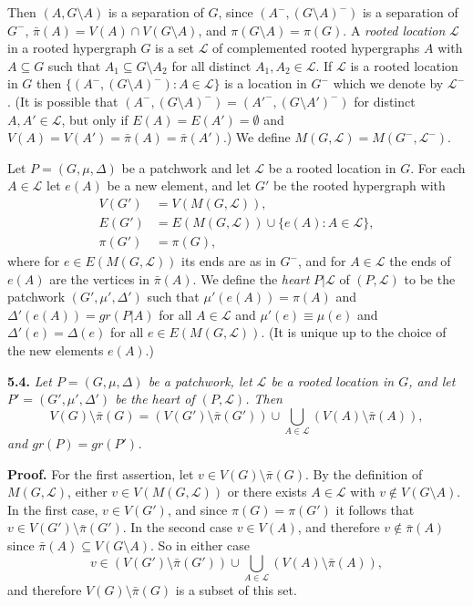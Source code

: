 Then $(A, G \setminus A)$ is a separation of $G$, since $(A^-, (G \setminus A)^-)$ is a separation of $G^-$, $\bar{\pi}(A) = V(A) \cap V(G \setminus A)$, and $\pi(G \setminus A) = \pi(G)$. A \textit{rooted location} $\mathscr{L}$ in a rooted hypergraph $G$ is a set $\mathscr{L}$ of complemented rooted hypergraphs $A$ with $A \subseteq G$ such that $A_1 \subseteq G \setminus A_2$ for all distinct $A_1, A_2 \in \mathscr{L}$. If $\mathscr{L}$ is a rooted location in $G$ then $\{(A^-, (G \setminus A)^-) \colon A \in \mathscr{L}\}$ is a location in $G^-$ which we denote by $\mathscr{L}^-$. (It is possible that $(A^-, (G \setminus A)^-) = (A'^-, (G \setminus A')^-)$ for distinct $A, A' \in \mathscr{L}$, but only if $E(A) = E(A') = \emptyset$ and $V(A) = V(A') = \bar{\pi}(A) = \bar{\pi}(A')$.) We define $M(G, \mathscr{L}) = M(G^-, \mathscr{L}^-)$.

Let $P = (G, \mu, \Delta)$ be a patchwork and let $\mathscr{L}$ be a rooted location in $G$. For each $A \in \mathscr{L}$ let $e(A)$ be a new element, and let $G'$ be the rooted hypergraph with
\begin{align*}
V(G') &= V(M(G, \mathscr{L})), \\
E(G') &= E(M(G, \mathscr{L})) \cup \{e(A) \colon A \in \mathscr{L}\}, \\
\pi(G') &= \pi(G),
\end{align*}
where for $e \in E(M(G, \mathscr{L}))$ its ends are as in $G^-$, and for $A \in \mathscr{L}$ the ends of $e(A)$ are the vertices in $\bar{\pi}(A)$. We define the \textit{heart} $P | \mathscr{L}$ of $(P, \mathscr{L})$ to be the patchwork $(G', \mu', \Delta')$ such that $\mu'(e(A)) = \pi(A)$ and $\Delta'(e(A)) = gr(P | A)$ for all $A \in \mathscr{L}$ and $\mu'(e) \equiv \mu(e)$ and $\Delta'(e) = \Delta(e)$ for all $e \in E(M(G, \mathscr{L}))$. (It is unique up to the choice of the new elements $e(A)$.)

\textbf{5.4.} \textit{Let $P = (G, \mu, \Delta)$ be a patchwork, let $\mathscr{L}$ be a rooted location in $G$, and let $P' = (G', \mu', \Delta')$ be the heart of $(P, \mathscr{L})$. Then}
\begin{equation*}
V(G) \setminus \bar{\pi}(G) = (V(G') \setminus \bar{\pi}(G')) \cup \bigcup_{A \in \mathscr{L}} (V(A) \setminus \bar{\pi}(A)),
\end{equation*}
\textit{and $gr(P) = gr(P')$.}

\textbf{Proof.} For the first assertion, let $v \in V(G) \setminus \bar{\pi}(G)$. By the definition of $M(G, \mathscr{L})$, either $v \in V(M(G, \mathscr{L}))$ or there exists $A \in \mathscr{L}$ with $v \notin V(G \setminus A)$. In the first case, $v \in V(G')$, and since $\pi(G) = \pi(G')$ it follows that $v \in V(G') \setminus \bar{\pi}(G')$. In the second case $v \in V(A)$, and therefore $v \notin \bar{\pi}(A)$ since $\bar{\pi}(A) \subseteq V(G \setminus A)$. So in either case
\begin{equation*}
v \in (V(G') \setminus \bar{\pi}(G')) \cup \bigcup_{A \in \mathscr{L}} (V(A) \setminus \bar{\pi}(A)),
\end{equation*}
and therefore $V(G) \setminus \bar{\pi}(G)$ is a subset of this set.

